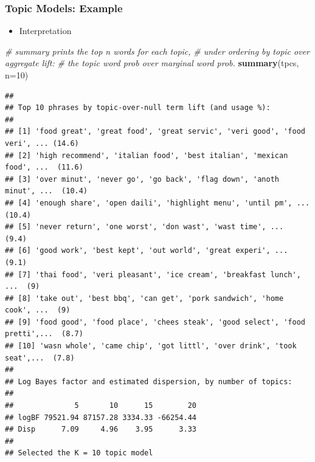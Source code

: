 \documentclass[
  shownotes,
  xcolor={svgnames},
  hyperref={colorlinks,citecolor=DarkBlue,linkcolor=DarkRed,urlcolor=DarkBlue}
  , aspectratio=169]{beamer}
\newenvironment{Shaded}{\begin{snugshade}}{\end{snugshade}}
\newcommand{\CommentTok}[1]{\textcolor[rgb]{0.56,0.35,0.01}{\textit{#1}}}
\newcommand{\DataTypeTok}[1]{\textcolor[rgb]{0.13,0.29,0.53}{#1}}
\newcommand{\DecValTok}[1]{\textcolor[rgb]{0.00,0.00,0.81}{#1}}
\newcommand{\KeywordTok}[1]{\textcolor[rgb]{0.13,0.29,0.53}{\textbf{#1}}}
\newcommand{\NormalTok}[1]{#1}
\begin{document}
\begin{frame}[fragile]
\frametitle{Topic Models: Example}

\begin{itemize}
\item Interpretation
\end{itemize}

\begin{scriptsize}


\begin{Shaded}
\begin{Highlighting}[]
\CommentTok{\# summary prints the top \textasciigrave{}n\textquotesingle{} words for each topic,}
\CommentTok{\# under ordering by \textasciigrave{}topic over aggregate\textquotesingle{} lift:}
\CommentTok{\#    the topic word prob over marginal word prob.}
\KeywordTok{summary}\NormalTok{(tpcs, }\DataTypeTok{n=}\DecValTok{10}\NormalTok{) }
\end{Highlighting}
\end{Shaded}
\end{scriptsize}
\begin{tiny}

\begin{verbatim}
## 
## Top 10 phrases by topic-over-null term lift (and usage %):
## 
## [1] 'food great', 'great food', 'great servic', 'veri good', 'food veri', ... (14.6) 
## [2] 'high recommend', 'italian food', 'best italian', 'mexican food', ...  (11.6) 
## [3] 'over minut', 'never go', 'go back', 'flag down', 'anoth minut', ...  (10.4) 
## [4] 'enough share', 'open daili', 'highlight menu', 'until pm', ...  (10.4) 
## [5] 'never return', 'one worst', 'don wast', 'wast time', ...  (9.4) 
## [6] 'good work', 'best kept', 'out world', 'great experi', ... (9.1) 
## [7] 'thai food', 'veri pleasant', 'ice cream', 'breakfast lunch', ...  (9) 
## [8] 'take out', 'best bbq', 'can get', 'pork sandwich', 'home cook', ...  (9) 
## [9] 'food good', 'food place', 'chees steak', 'good select', 'food pretti',...  (8.7) 
## [10] 'wasn whole', 'came chip', 'got littl', 'over drink', 'took seat',...  (7.8) 
## 
## Log Bayes factor and estimated dispersion, by number of topics:
## 
##              5       10      15        20
## logBF 79521.94 87157.28 3334.33 -66254.44
## Disp      7.09     4.96    3.95      3.33
## 
## Selected the K = 10 topic model
\end{verbatim}
\end{tiny}
\end{frame}
\end{document}
